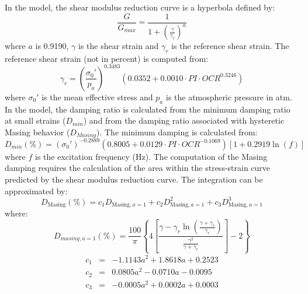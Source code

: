\documentclass[12pt,oneside]{book}
\begin{document}
In the \citet{darendeli:01} model, the shear modulus reduction curve is a hyperbola defined by:
\begin{equation}
    \frac{G}{G_{max}} = \frac{1}{1 + \left( \frac{\gamma}{\gamma_r} \right)^{a}}
    \label{eq:shearmod}
\end{equation}
where $a$ is 0.9190, $\gamma$ is the shear strain and $\gamma_r$ is the reference shear strain.  The reference
shear strain (not in percent) is computed from:
\begin{equation}
    \gamma_r = \left(\frac{\sigma_0'}{p_a}\right)^{0.3483} \left( 0.0352 + 0.0010 \cdot PI \cdot OCR^{0.3246} \right)
\end{equation}
where $\sigma_0'$ is the mean effective stress and $p_a$ is the atmospheric pressure in atm. In the
model, the damping ratio is calculated from the minimum damping ratio at small strains ($D_{min}$)
and from the damping ratio associated with hysteretic Masing behavior ($D_{Masing}$).  The minimum
damping is calculated from:
\begin{equation}
    D_{min}(\%) = (\sigma_0')^{-0.2889} \left( 0.8005 + 0.0129 \cdot PI \cdot OCR ^{-0.1069} \right) \left[
    1 + 0.2919 \ln\left( f \right) \right]
    \label{eq:dmin}
\end{equation}
where $f$ is the excitation frequency (Hz). The computation of the Masing damping requires the
calculation of the area within the stress-strain curve predicted by the shear modulus reduction
curve.  The integration can be approximated by:
\begin{equation}
    D_\text{Masing}(\%) = c_1 D_{\text{Masing},a=1} + c_2 D_{\text{Masing},a=1}^2 + c_3
    D_{\text{Masing},a=1}^3
    \label{eq:dmasing}
\end{equation}
where:
\begin{equation}
    D_{masing,a=1}(\%) = \frac{100}{\pi} \left\{ 4 \left[ \frac{\gamma - \gamma_r\ln\left( \frac{\gamma +
    \gamma_r}{\gamma_r} \right)}{\frac{\gamma^2}{\gamma+\gamma_r}} \right] - 2 \right\} %
\end{equation}
\begin{equation}
    \begin{array}{rcl}
        c_1 & = & -1.1143 a^2 + 1.8618 a + 0.2523 \\
        c_2 & = & 0.0805 a^2 - 0.0710 a - 0.0095 \\
        c_3 & = & -0.0005 a^2 + 0.0002 a + 0.0003 \\
    \end{array}
\end{equation}
\end{document}

